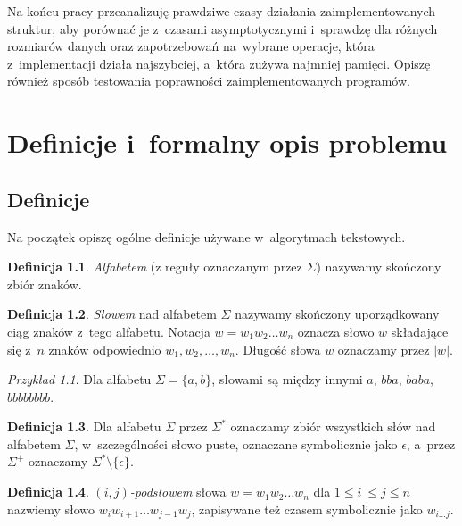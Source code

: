 \documentclass[declaration,shortabstract]{iithesis}
\theoremstyle{definition} \newtheorem{definition}{Definicja}[chapter]
\theoremstyle{remark} \newtheorem{remark}[definition]{Obserwacja}
\theoremstyle{plain} \newtheorem{theorem}[definition]{Twierdzenie}
\theoremstyle{remark} \newtheorem{example}{Przykład}[definition]
\theoremstyle{plain} \newtheorem{lemma}[definition]{Lemat}
\begin{document}
Na końcu pracy przeanalizuję prawdziwe czasy działania zaimplementowanych struktur, aby porównać je z~czasami asymptotycznymi i~sprawdzę dla różnych rozmiarów danych oraz zapotrzebowań na~wybrane operacje, która z~implementacji działa najszybciej, a~która zużywa najmniej pamięci. Opiszę również sposób testowania poprawności zaimplementowanych programów.

\chapter{Definicje i~formalny opis problemu}

\section{Definicje}

Na początek opiszę ogólne definicje używane w~algorytmach tekstowych.

\begin{definition}
    \textit{Alfabetem} (z reguły oznaczanym przez $\Sigma$) nazywamy skończony zbiór znaków.    
\end{definition}

\begin{definition}
    \textit{Słowem} nad alfabetem $\Sigma$ nazywamy skończony uporządkowany ciąg znaków z~tego alfabetu. Notacja $w = w_1 w_2 \ldots w_{n}$ oznacza słowo $w$ składające się z~$n$ znaków odpowiednio $w_1, w_2, \ldots, w_{n}$. Długość słowa $w$ oznaczamy przez $|w|$.
\end{definition}

\begin{example}
    Dla alfabetu $\Sigma = \{a, b\}$, słowami są między innymi $a$, $bba$, $baba$, $bbbbbbbb$.
\end{example}

\begin{definition}
    Dla alfabetu $\Sigma$ przez $\Sigma^*$ oznaczamy zbiór wszystkich słów nad alfabetem $\Sigma$, w~szczególności słowo puste, oznaczane symbolicznie jako $\epsilon$, a~przez $\Sigma^+$ oznaczamy $\Sigma^* \setminus \{ \epsilon \}$.
\end{definition}

\begin{definition}
    \textit{$(i, j)$-podsłowem} słowa $w = w_1 w_2 \ldots w_{n}$ dla $1 \leq i~\leq j \leq n$ nazwiemy słowo $w_i w_{i+1} \ldots w_{j-1} w_j$, zapisywane też czasem symbolicznie jako $w_{i \ldots j}$.
\end{definition}
\end{document}
